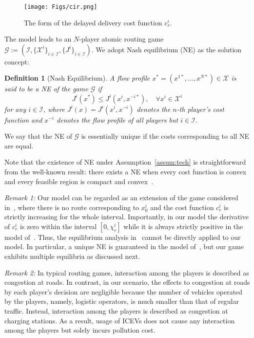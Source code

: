 \documentclass[letterpaper, 10 pt, conference]{ieeeconf}  %
\newcommand{\mc}[1]{\mathcal{#1}}
\newtheorem{defin}{Definition}
\begin{document}
\begin{figure}[t]
  \centering
  \texttt{[image: Figs/cir.png]}
  \caption{
  The form of the delayed delivery cost function $c^i_r$.
  }
  \label{fig:cir}
\end{figure}

The model leads to an $N$-player atomic routing game $\mc{G}:=(\mc{I},\{\mc{X}^i\}_{i \in \mc{I}},\{J^i\}_{i \in \mc{I}})$.
We adopt Nash equilibrium (NE) as the solution concept:
\begin{defin}[Nash Equilibrium]
A flow profile $x^{\ast}=(x^{1{\ast}},\ldots,x^{N{\ast}})\in\mc{X}$ is said to be a NE of the game $\mc{G}$ if
\[
 J^i(x^{\ast})\leq J^i(x^i,x^{-i{\ast}}),\quad \forall x^i\in\mc{X}^i
\]
for any $i \in \mc{I}$, where $J^i(x)=J^i(x^i,x^{-i})$ denotes the $n$-th player's cost function and $x^{-i}$ denotes the flow profile of all players but $i \in \mc{I}$.
\end{defin}

We say that the NE of $\mc{G}$ is essentially unique if the costs corresponding to all NE are equal.

Note that the existence of NE under Assumption~\ref{assum:tech} is straightforward from the well-known result: there exists a NE when every cost function is convex and every feasible region is compact and convex~\cite[Theorem 4.7.2]{Laraki2019Mathematical}.

\emph{Remark 1:}
Our model can be regarded as an extension of the game considered in~\cite{Jacquot2018Analysis}, where there is no route corresponding to $x^i_0$ and the cost function $c^i_r$ is strictly increasing for the whole interval.
Importantly, in our model the derivative of $c^i_r$ is zero within the interval $[0,\chi^i_r]$ while it is always strictly positive in the model of~\cite{Jacquot2018Analysis}.
Thus, the equilibrium analysis in~\cite{Jacquot2018Analysis} cannot be directly applied to our model.
In particular, a unique NE is guaranteed in the model of~\cite{Jacquot2018Analysis}, but our game exhibits multiple equilibria as discussed next.
\fi

\emph{Remark 2:}
In typical routing games, interaction among the players is described as congestion at roads.
In contrast, in our scenario, the effects to congestion at roads by each player's decision are negligible because the number of vehicles operated by the players, namely, logistic operators, is much smaller than that of regular traffic.
Instead, interaction among the players is described as congestion at charging stations.
As a result, usage of ICEVs does not cause any interaction among the players but solely incurs pollution cost.
\fi
\end{document}
